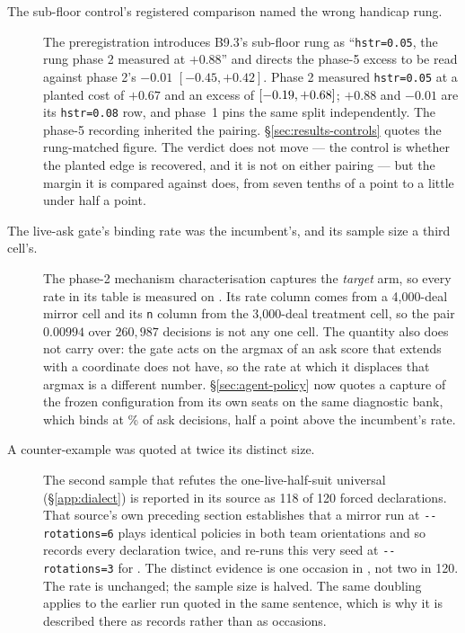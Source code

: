\begin{description}
\item[The sub-floor control's registered comparison named the wrong handicap rung.] The
  preregistration introduces B9.3's sub-floor rung as ``\texttt{hstr=0.05}, the rung phase 2 measured
  at $+0.88$'' and directs the phase-5 excess to be read against phase 2's $-0.01$
  $[-0.45, +0.42]$. Phase 2 measured \texttt{hstr=0.05} at a planted cost of $+0.67$ and an excess of
  \vsevenSubFloorExcess{} $[-0.19, +0.68]$; $+0.88$ and $-0.01$
  are its \texttt{hstr=0.08} row, and phase~1 pins the same split independently. The phase-5
  recording inherited the pairing. \S\ref{sec:results-controls} quotes the rung-matched figure. The
  verdict does not move --- the control is whether the planted edge is recovered, and it is not on
  either pairing --- but the margin it is compared against does, from seven tenths of a point to a
  little under half a point.

\item[The live-ask gate's binding rate was the incumbent's, and its sample size a third cell's.] The
  phase-2 mechanism characterisation captures the \emph{target} arm, so every rate in its table is
  measured on \vsix{}. Its rate column comes from a 4,000-deal mirror cell and its
  \texttt{n} column from the 3,000-deal treatment cell, so the pair
  $0.00994$ over $260{,}987$ decisions is not any one cell. The quantity also does not carry over:
  the gate acts on the argmax of an ask score that \sestina{} extends with a coordinate
  \vsix{} does not have, so the rate at which it displaces that argmax is a different number.
  \S\ref{sec:agent-policy} now quotes a capture of the frozen configuration from its own seats on the
  same diagnostic bank, which binds at \vsevenGateBindRate\% of \vsevenGateBindN{} ask decisions,
  half a point above the incumbent's rate.

\item[A counter-example was quoted at twice its distinct size.] The second sample that refutes the
  one-live-half-suit universal (\S\ref{app:dialect}) is reported in its source as 118 of 120 forced
  declarations. That source's own preceding section establishes that a mirror run at
  \texttt{-{}-rotations=6} plays identical policies in both team orientations and so records every
  declaration twice, and re-runs this very seed at \texttt{-{}-rotations=3} for
  \vsevenLadderSecondTotal{}. The distinct evidence is one occasion in \vsevenLadderSecondTotal{},
  not two in 120. The rate is unchanged; the sample size is halved. The same doubling applies to the
  earlier run quoted in the same sentence, which is why it is described there as records rather than
  as occasions.


\end{description}
